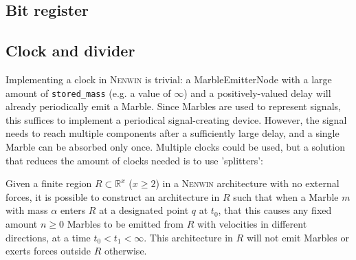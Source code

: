 \subsection{Bit register}


\subsection{Clock and divider}
Implementing a clock in \textsc{Nenwin} is trivial: a MarbleEmitterNode with a large amount of \texttt{stored\_mass} (e.g. a value of $\infty$) and a positively-valued delay will already periodically emit a Marble. Since Marbles are used to represent signals, this suffices to implement a periodical signal-creating device. However, the signal needs to reach multiple components after a sufficiently large delay, and a single Marble can be absorbed only once. Multiple clocks could be used, but a solution that reduces the amount of clocks needed is to use 'splitters':
\begin{lemma}
    Given a finite region $R \subset \mathbb{R}^x$ ($x \geq 2$) in a \textsc{Nenwin} architecture with no external forces, it is possible to construct an architecture in $R$ such that when a Marble $m$ with mass $\alpha$ enters $R$ at a designated point $q$ at $t_0$, that this causes any fixed amount $n \geq 0$ Marbles to be emitted from $R$ with velocities in different directions, at a time $t_0 < t_1 < \infty$. This architecture in $R$ will not emit Marbles or exerts forces outside $R$ otherwise.
    \label{lemma:splitter}
\end{lemma}
